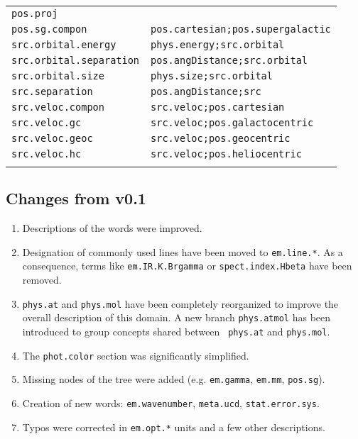 \documentclass[11pt,a4paper]{ivoa}
\begin{document}
\begin{enumerate}
\begin{tabular}{|l|l|}
{\tt pos.proj} & \\
{\tt pos.sg.compon} & {\tt pos.cartesian;pos.supergalactic}\\
{\tt src.orbital.energy} & {\tt phys.energy;src.orbital}\\
{\tt src.orbital.separation} & {\tt pos.angDistance;src.orbital}\\
{\tt src.orbital.size} & {\tt phys.size;src.orbital}\\
{\tt src.separation} & {\tt pos.angDistance;src}\\
{\tt src.veloc.compon} & {\tt src.veloc;pos.cartesian}\\ 
{\tt src.veloc.gc} & {\tt src.veloc;pos.galactocentric}\\
{\tt src.veloc.geoc} & {\tt src.veloc;pos.geocentric}\\
{\tt src.veloc.hc} & {\tt src.veloc;pos.heliocentric}\\
\sptablerule
\end{tabular}
\end{enumerate}

\subsection{Changes from v0.1}
\begin{enumerate}
\item Descriptions of the words were improved.
\item Designation of commonly used lines have been moved to {\tt em.line.*}. As a consequence, terms like 
{\tt em.IR.K.Brgamma} or {\tt spect.index.Hbeta} have been removed.
\item {\tt phys.at} and {\tt phys.mol} have been completely reorganized to improve the overall description 
of this domain. A new branch {\tt phys.atmol} has been introduced to group concepts shared between {\tt 
phys.at} and {\tt phys.mol}.
\item The {\tt phot.color} section was significantly simplified.
\item Missing nodes of the tree were added (e.g. {\tt em.gamma}, {\tt em.mm}, {\tt pos.sg}).
\item Creation of new words: {\tt em.wavenumber}, {\tt meta.ucd}, {\tt stat.error.sys}.
\item Typos were corrected in {\tt em.opt.*} units and a few other descriptions.
\end{enumerate}


\end{document}
